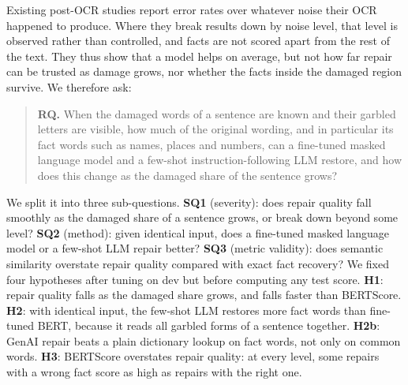 Existing post-OCR studies report error rates over whatever noise their OCR happened to produce. Where they break
results down by noise level, that level is observed rather than controlled, and facts are not scored apart from the
rest of the text. They thus show that a model helps on average, but not how far repair can be trusted as damage
grows, nor whether the facts inside the damaged region survive. We therefore ask:

\begin{quote}
\textbf{RQ.} When the damaged words of a sentence are known and their garbled letters are visible, how much of the
original wording, and in particular its fact words such as names, places and numbers, can a fine-tuned masked
language model and a few-shot instruction-following LLM restore, and how does this change as the damaged share of
the sentence grows?
\end{quote}

\noindent We split it into three sub-questions. \textbf{SQ1} (severity): does repair quality fall smoothly as the
damaged share of a sentence grows, or break down beyond some level? \textbf{SQ2} (method): given identical input,
does a fine-tuned masked language model or a few-shot LLM repair better? \textbf{SQ3} (metric validity): does
semantic similarity overstate repair quality compared with exact fact recovery?
We fixed four hypotheses after tuning on dev but before computing any test score. \textbf{H1}: repair quality falls
as the damaged share grows, and \frr{} falls faster than BERTScore. \textbf{H2}: with identical input, the few-shot
LLM restores more fact words than fine-tuned BERT, because it reads all garbled forms of a sentence together.
\textbf{H2b}: GenAI repair beats a plain dictionary lookup on fact words, not only on common words. \textbf{H3}:
BERTScore overstates repair quality: at every level, some repairs with a wrong fact score as high as repairs with
the right one.

